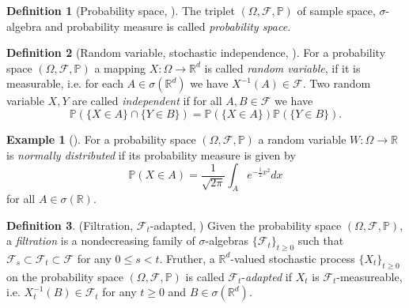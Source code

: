 \documentclass[12pt]{article}
\theoremstyle{definition}
\newtheorem{example}[example]{Example}
\newtheorem{definition}[definition]{Definition}
\numberwithin{equation}{section}
\newcommand{\R}{\mathbb{R}}
\newcommand{\BP}{\mathbb{P}}
\newcommand{\CF}{\mathcal{F}}
\begin{document}
 \begin{definition}[Probability space, ]
   The triplet $(\Omega, \CF, \BP)$ of sample space, $\sigma$-algebra and probability measure is called \emph{probability space}.
 \end{definition}
 \begin{definition}[Random variable, stochastic independence, ]
  For a probability space $(\Omega, \CF, \BP)$ a mapping $X : \Omega \rightarrow \R^d$ is called \emph{random variable}, if it is measurable, i.e. for each $A \in \sigma(\R^d)$ we have $X^{-1}(A) \in \CF$.
  Two random variable $X, Y$ are called \emph{independent} if for all $A,B \in \CF$ we have
  \begin{equation*}
    \BP(\{X \in A\} \cap \{Y \in B\}) = \BP(\{X \in A\})\BP(\{Y \in B\}).
  \end{equation*}
 \end{definition}
 \begin{example}[]
  For a probability space $(\Omega, \CF, \BP)$ a random variable $W : \Omega \rightarrow \R$ is \emph{normally distributed} if its probability measure is given by
  \begin{equation*}
    \BP(X \in A) = \frac{1}{\sqrt{2 \pi}} \int_A e^{-\frac{1}{2}x^2}dx
  \end{equation*}
  for all $A \in \sigma(\R)$.
 \end{example}
 \begin{definition}(Filtration, $\CF_t$-adapted, )
   Given the probability space $(\Omega, \CF, \BP)$, a \emph{filtration} is a nondecreasing family of $\sigma$-algebras $\{\CF_t\}_{t\geq 0}$ such that $\CF_s \subset \CF_t \subset \CF$ for any $0 \leq s < t$. Fruther, a $\R^d$-valued stochastic process $\{X_t\}_{t \geq 0}$ on the probability space  $(\Omega, \CF, \BP)$ is called $\CF_t$-\emph{adapted} if $X_t$ is $\CF_t$-measureable, i.e. $X_t^{-1}(B) \in \CF_t$ for any $t \geq 0$ and $B \in \sigma(\R^d)$.
 \end{definition}
 
\end{document}
